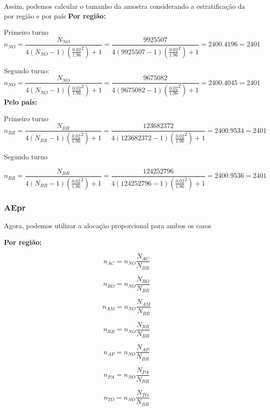 \documentclass{article}
\begin{document}
Assim, podemos calcular o tamanho da amostra considerando a estratificação da por região e por país
\newpage
\textbf{Por região:}

Primeiro turno
\[
n_{NO} = \frac{N_{NO}}{4(N_{NO}-1)(\frac{0.02}{1.96}^2) + 1 } = \frac{9925507}{4(9925507 - 1) (\frac{0.02}{1.96}^2) + 1} = 2400.4196 = 2401
\]

Segundo turno:
\[
n_{NO} = \frac{N_{NO}}{4(N_{NO}-1)(\frac{0.02}{1.96}^2) + 1 } = \frac{9675082}{4(9675082 - 1) (\frac{0.02}{1.96}^2) + 1} = 2400.4045 = 2401
\]
\textbf{Pelo país:}

Primeiro turno
\[
n_{BR} = \frac{N_{BR}}{4(N_{BR}-1)(\frac{0.02}{1.96}^2) + 1 } = \frac{123682372}{4(123682372 - 1) (\frac{0.02}{1.96}^2) + 1} = 2400.9534 = 2401
\]

Segundo turno

\[
n_{BR} = \frac{N_{BR}}{4(N_{BR}-1)(\frac{0.02}{1.96}^2) + 1 } = \frac{124252796}{4(124252796 - 1) (\frac{0.02}{1.96}^2) + 1} = 2400.9536 = 2401
\]

\subsubsection*{AEpr}

Agora, podemos utilizar a alocação proporcional para ambos os casos

\textbf{Por região:}

\[
n_{AC} = n_{NO}\frac{N_{AC}}{N_{BR}}
\]

\[
n_{RO} = n_{NO}\frac{N_{RO}}{N_{BR}}
\]

\[
n_{AM} = n_{NO}\frac{N_{AM}}{N_{BR}}
\]

\[
n_{RR} = n_{NO}\frac{N_{RR}}{N_{BR}}
\]

\[
n_{AP} = n_{NO}\frac{N_{AP}}{N_{BR}}
\]

\[
n_{PA} = n_{NO}\frac{N_{PA}}{N_{BR}}
\]

\[
n_{TO} = n_{NO}\frac{N_{TO}}{N_{BR}}
\]
\end{document}
